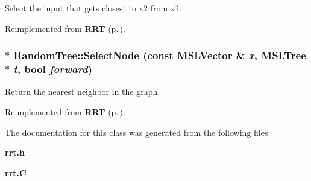 Select the input that gets closest to x2 from x1.



Reimplemented from {\bf RRT} {\rm (p.\,\pageref{classRRT_b0})}.
\subsubsection{ $\ast$ Random\-Tree::Select\-Node (const {\bf MSLVector} \& {\em x}, {\bf MSLTree} $\ast$ {\em t}, bool {\em forward})\hspace{0.3cm}{\tt  [protected, virtual]}}\label{classRandomTree_b0}


Return the nearest neighbor in the graph.



Reimplemented from {\bf RRT} {\rm (p.\,\pageref{classRRT_b1})}.

The documentation for this class was generated from the following files:\begin{CompactItemize}
\item 
{\bf rrt.h}\item 
{\bf rrt.C}\end{CompactItemize}
